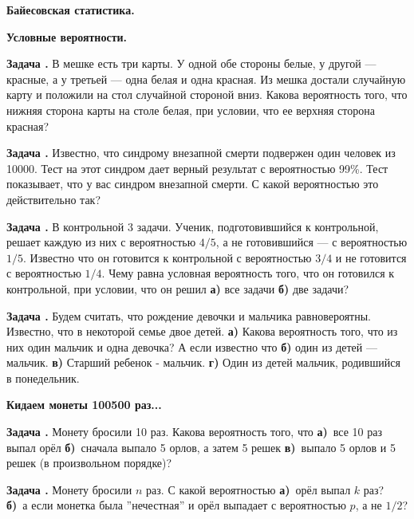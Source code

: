 \documentclass[11pt,a4paper]{article}
\newcounter{znum}
\newcommand{\z}[1]{\addtocounter{znum}{1} \textbf{Задача \arabic{znum}#1. }}
\renewcommand{\!}{\textcolor{red}{!}}
\begin{document}
\pagestyle{empty}

\begin{center}
	\Large
	\textbf{Байесовская статистика.}\\
\end{center}

\begin{center}
	\large
	\textbf{Условные вероятности.}\\
\end{center}


\z{} В мешке есть три карты. У одной обе стороны белые, у другой --- красные, а у третьей --- одна белая и одна красная. Из мешка достали случайную карту и положили на стол случайной стороной вниз. Какова вероятность того, что нижняя сторона карты на столе белая, при условии, что ее верхняя сторона красная?

\z{} Известно, что синдрому внезапной смерти подвержен один человек из 10000. Тест на этот синдром дает верный результат с вероятностью 99\%. Тест показывает, что у вас синдром внезапной смерти. С какой вероятностью это действительно так?

\z{} В контрольной 3 задачи. Ученик, подготовившийся к контрольной, решает каждую из
них с вероятностью $4/5$, а не готовившийся --- с вероятностью $1/5$. Известно что он готовится к контрольной с вероятностью $3/4$ и не готовится с вероятностью $1/4$. Чему равна условная вероятность того, что он готовился к контрольной, при условии, что он решил \textbf{а)} все задачи \textbf{б)} две задачи?

\z{} Будем считать, что рождение девочки и мальчика равновероятны. Известно, что в некоторой семье двое детей. \textbf{а)} Какова вероятность того, что из них один мальчик и одна девочка? А если известно что
\textbf{б)} один из детей — мальчик.
\textbf{в)} Старший ребенок - мальчик.
\textbf{г)} Один из детей мальчик, родившийся в понедельник.


\begin{center}
	\large
	\textbf{Кидаем монеты 100500 раз...}\\
\end{center}

\z{} Монету бросили 10 раз. Какова вероятность того, что \textbf{а)}~все 10 раз выпал орёл \textbf{б)}~сначала выпало 5 орлов, а затем 5 решек \textbf{в)}~выпало 5 орлов и 5 решек (в произвольном порядке)?

\z{} Монету бросили $n$ раз. С какой вероятностью \textbf{а)}~орёл выпал $k$ раз? \textbf{б)}~а если монетка была ''нечестная'' и орёл выпадает с вероятностью $p$, а не $1/2$?
\end{document}
